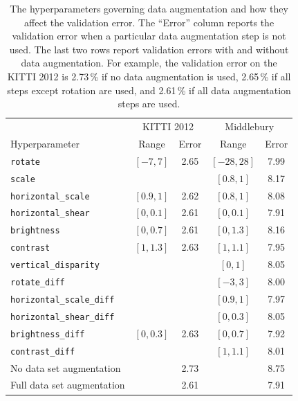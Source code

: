 \documentclass[twoside,11pt]{article}
\begin{document}
\begin{table}[tb]
\begin{center}
\begin{tabular}{l cc cc}\toprule

& \multicolumn{2}{c}{KITTI 2012} &
\multicolumn{2}{c}{Middlebury}\\
\cmidrule(lr){2-3}
\cmidrule(lr){4-5}
Hyperparameter & Range & Error & Range & Error \\\midrule

\texttt{rotate} & \([-7, 7] \) & 2.65 & \([-28, 28]\) & 7.99 \\
\texttt{scale} & & & \([0.8, 1]\) & 8.17 \\
\texttt{horizontal\_scale} & \([0.9, 1]\) & 2.62 & \([0.8, 1]\) & 8.08 \\
\texttt{horizontal\_shear} & \([0, 0.1]\) & 2.61 & \([0, 0.1]\) & 7.91 \\
\texttt{brightness} & \([0, 0.7]\) & 2.61 & \([0, 1.3]\) & 8.16 \\
\texttt{contrast} & \([1, 1.3]\) & 2.63 & \([1, 1.1]\) & 7.95 \\
\texttt{vertical\_disparity} & & & \([0, 1]\) & 8.05 \\
\texttt{rotate\_diff} & & & \([-3, 3]\) & 8.00 \\
\texttt{horizontal\_scale\_diff} & & & \([0.9, 1]\) & 7.97\\
\texttt{horizontal\_shear\_diff} & & & \([0, 0.3]\) & 8.05\\
\texttt{brightness\_diff} & \([0, 0.3] \) & 2.63 & \([0, 0.7]\) & 7.92 \\
\texttt{contrast\_diff} & & & \([1, 1.1]\) & 8.01 \\\midrule
No data set augmentation & & 2.73 & & 8.75 \\
Full data set augmentation & & 2.61 & & 7.91 \\\bottomrule
\end{tabular}
\caption{The hyperparameters governing data augmentation and how they affect
the validation error. The ``Error'' column reports the validation error when a
particular data augmentation step is not used. The last two rows report
validation errors with and without data augmentation. For example, the
validation error on the KITTI 2012 is 2.73\,\% if no data augmentation is used,
2.65\,\% if all steps except rotation are used, and 2.61\,\% if all data
augmentation steps are used. }

\label{tbl:da_params}
\end{center}
\end{table}
\end{document}
